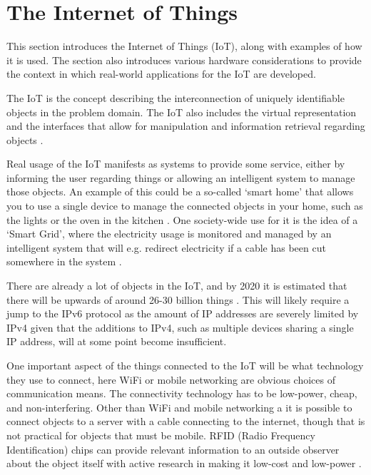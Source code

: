 \section{The Internet of Things}
This section introduces the Internet of Things (IoT), along with examples of how it is used. The section also introduces various hardware considerations to provide the context in which real-world applications for the IoT are developed.

The IoT is the concept describing the interconnection of uniquely identifiable objects in the problem domain.
The IoT also includes the virtual representation and the interfaces that allow for manipulation and information retrieval regarding objects \citep{misc:InternetOfThingsDefinition, misc:InternetOfThingsDefinition2, misc:InternetOfThingsDefinition3}.

Real usage of the IoT manifests as systems to provide some service, either by informing the user regarding things or allowing an intelligent system to manage those objects.
An example of this could be a so-called `smart home' that allows you to use a single device to manage the connected objects in your home, such as the lights or the oven in the kitchen \citep{misc:InternetOfThingsExamples}.
One society-wide use for it is the idea of a `Smart Grid', where the electricity usage is monitored and managed by an intelligent system that will e.g. redirect electricity if a cable has been cut somewhere in the system \citep{misc:smartGrid}.

There are already a lot of objects in the IoT, and by 2020 it is estimated that there will be upwards of around 26-30 billion things \citep{misc:IoTGrowth1,misc:IoTGrowth2}.
This will likely require a jump to the IPv6 protocol as the amount of IP addresses are severely limited by IPv4 \citep{misc:numberOfAddresses} given that the additions to IPv4, such as multiple devices sharing a single IP address, will at some point become insufficient.

One important aspect of the things connected to the IoT will be what technology they use to connect, here WiFi or mobile networking are obvious choices of communication means.
The connectivity technology has to be low-power, cheap, and non-interfering.
Other than WiFi and mobile networking a it is possible to connect objects to a server with a cable connecting to the internet, though that is not practical for objects that must be mobile.
RFID (Radio Frequency Identification) chips can provide relevant information to an outside observer about the object itself \citep{misc:rfid} with active research in making it low-cost and low-power \citep{misc:rfid2}.


